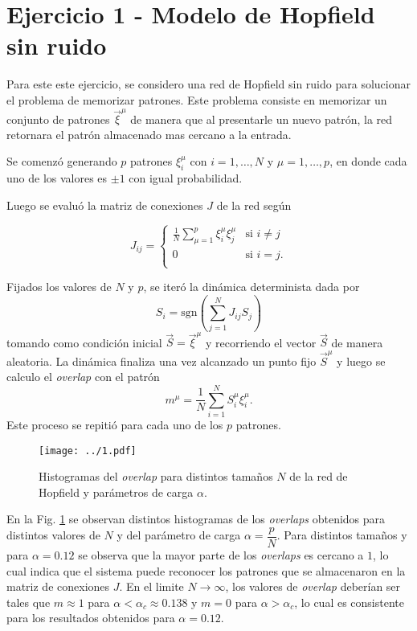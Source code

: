 \section*{Ejercicio 1 - Modelo de Hopfield sin ruido}

Para este este ejercicio, se considero una red de Hopfield sin ruido para solucionar el problema de memorizar patrones. Este problema consiste en memorizar un conjunto de patrones $\vec{\xi}^{\mu}$ de manera que al presentarle un nuevo patrón, la red retornara el patrón almacenado mas cercano a la entrada.

Se comenzó generando $p$ patrones $\xi_{i}^{\mu}$ con $i=1,\dots,N$ y $\mu=1,\dots,p$, en donde cada uno de los valores es $\pm1$ con igual probabilidad.

Luego se evaluó la matriz de conexiones $J$ de la red según

\begin{equation}
    J_{ij} =
    \left\{ \begin{array}{lcc}
        \frac{1}{N} \sum_{\mu=1}^{p} \xi_{i}^{\mu} \xi_{j}^{\mu}  & \text{si } i\neq j \\
        0           & \text{si } i=j. \\
        \end{array}
    \right.
    \label{eq:J}
\end{equation}

Fijados los valores de $N$ y $p$, se iteró la dinámica determinista dada por 
\begin{equation}
    S_{i} = \text{sgn} \left( \sum_{j=1}^{N} J_{ij} S_{j} \right)
\end{equation}
tomando como condición inicial $\vec{S} = \vec{\xi}^{\mu}$ y recorriendo el vector $\vec{S}$ de manera aleatoria. La dinámica finaliza una vez alcanzado un punto fijo $\vec{S}^{\mu}$ y luego se calculo el \textit{overlap} con el patrón
\begin{equation}
    m^{\mu} = \frac{1}{N}\sum_{i=1}^{N} S_{i}^{\mu} \xi_{i}^{\mu}.
\end{equation}
Este proceso se repitió para cada uno de los $p$ patrones.

\begin{figure}[htb!]
    \centering
    \texttt{[image: ../1.pdf]}
    \caption{Histogramas del \textit{overlap} para distintos tamaños $N$ de la red de Hopfield y parámetros de carga $\alpha$.}
    \label{fig:01}
\end{figure}

En la Fig. \ref{fig:01} se observan distintos histogramas de los \textit{overlaps} obtenidos para distintos valores de $N$ y del parámetro de carga $\alpha = \dfrac{p}{N}$. Para distintos tamaños y para $\alpha=0.12$ se observa que la mayor parte de los \textit{overlaps} es cercano a $1$, lo cual indica que el sistema puede reconocer los patrones que se almacenaron en la matriz de conexiones $J$. En el limite $N\rightarrow\infty$, los valores de \textit{overlap} deberían ser tales que $m\approx1$ para $\alpha < \alpha_{c} \approx 0.138$ y $m=0$ para $\alpha > \alpha_{c}$, lo cual es consistente para los resultados obtenidos para $\alpha = 0.12$.

